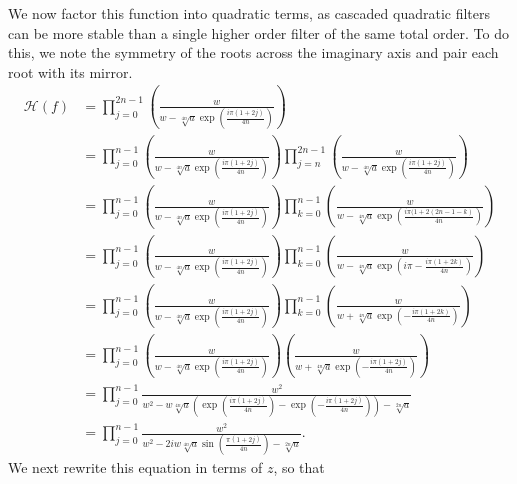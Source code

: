 \documentclass[a4paper]{article}
\begin{document}
We now factor this function into quadratic terms, as cascaded quadratic filters
can be more stable than a single higher order filter of the same total order.
To do this, we note the symmetry of the roots across the imaginary axis and
pair each root with its mirror.
\begin{align}
    \mathcal{H}(f) &= \prod_{j=0}^{2 n - 1} \left(\frac{w}{w - \sqrt[4n]{a}\exp\left(\frac{i \pi (1 + 2 j)}{4 n}\right)}\right) \\
        &= \prod_{j=0}^{n - 1} \left(\frac{w}{w - \sqrt[4n]{a}\exp\left(\frac{i \pi (1 + 2 j)}{4 n}\right)}\right)
           \prod_{j=n}^{2 n - 1} \left(\frac{w}{w - \sqrt[4n]{a}\exp\left(\frac{i \pi (1 + 2 j)}{4 n}\right)}\right) \\
        &= \prod_{j=0}^{n - 1} \left(\frac{w}{w - \sqrt[4n]{a}\exp\left(\frac{i \pi (1 + 2 j)}{4 n}\right)}\right)
           \prod_{k=0}^{n - 1} \left(\frac{w}{w - \sqrt[4n]{a}\exp\left(\frac{i \pi (1 + 2 (2 n - 1 - k)}{4 n}\right)}\right) \\
        &= \prod_{j=0}^{n - 1} \left(\frac{w}{w - \sqrt[4n]{a}\exp\left(\frac{i \pi (1 + 2 j)}{4 n}\right)}\right)
           \prod_{k=0}^{n - 1} \left(\frac{w}{w - \sqrt[4n]{a}\exp\left(i \pi-\frac{i \pi (1 + 2 k)}{4 n}\right)}\right) \\
        &= \prod_{j=0}^{n - 1} \left(\frac{w}{w - \sqrt[4n]{a}\exp\left(\frac{i \pi (1 + 2 j)}{4 n}\right)}\right)
           \prod_{k=0}^{n - 1} \left(\frac{w}{w + \sqrt[4n]{a}\exp\left(-\frac{i \pi (1 + 2 k)}{4 n}\right)}\right) \\
        &= \prod_{j=0}^{n - 1}
           \left(\frac{w}{w - \sqrt[4n]{a}\exp\left(\frac{i \pi (1 + 2 j)}{4 n}\right)}\right)
           \left(\frac{w}{w + \sqrt[4n]{a}\exp\left(-\frac{i \pi (1 + 2 j)}{4 n}\right)}\right) \\
        &= \prod_{j=0}^{n - 1}
           \frac{w^2}{w^2 - w \sqrt[4n]{a} \left(\exp\left(\frac{i \pi (1 + 2 j)}{4 n}\right) -
           \exp\left(-\frac{i \pi (1 + 2 j)}{4 n}\right)\right) - \sqrt[2n]{a}} \\
        &= \prod_{j=0}^{n - 1}
           \frac{w^2}{w^2 - 2 i w \sqrt[4n]{a} \sin\left(\frac{\pi (1 + 2 j)}{4 n}\right) - \sqrt[2n]{a}}.
\end{align}
We next rewrite this equation in terms of $z$, so that
\end{document}
